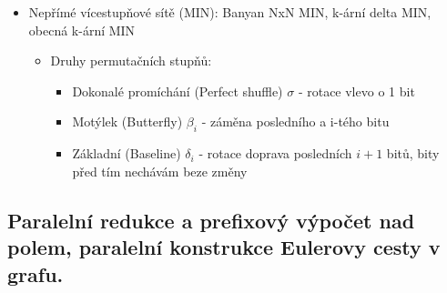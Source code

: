 \documentclass[a4paper,hidelinks]{article}
\begin{document}
\begin{itemize}
\begin{itemize}
\begin{itemize}
        \end{itemize}
    \end{itemize}
    \item Nepřímé vícestupňové sítě (MIN): Banyan NxN MIN, k-ární delta MIN, obecná k-ární MIN
    \begin{itemize}
        \item Druhy permutačních stupňů:
        \begin{itemize}
            \item Dokonalé promíchání (Perfect shuffle) $\sigma$ - rotace vlevo o 1 bit
            \item Motýlek (Butterfly) $\beta_i$ - záměna posledního a i-tého bitu
            \item Základní (Baseline) $\delta_i$ - rotace doprava posledních $i+1$ bitů, bity před tím nechávám beze změny
        \end{itemize}
    \end{itemize}
\end{itemize}

\subsection{Paralelní redukce a prefixový výpočet nad polem, paralelní konstrukce Eulerovy cesty v grafu.}
\end{document}
